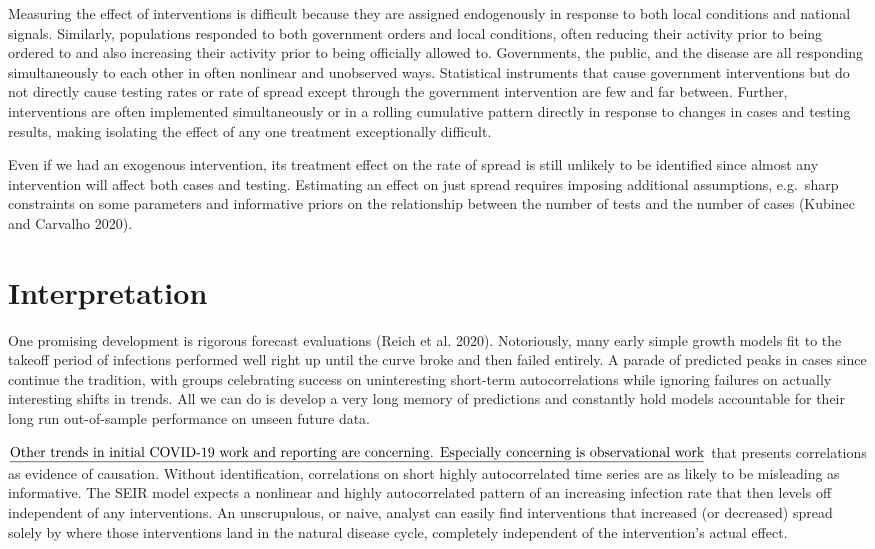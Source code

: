 \documentclass[10pt,letterpaper]{article}
\begin{document}
Measuring the effect of interventions is difficult because they are
assigned endogenously in response to both local conditions and national
signals. Similarly, populations responded to both government orders and
local conditions, often reducing their activity prior to being ordered
to and also increasing their activity prior to being officially allowed
to. Governments, the public, and the disease are all responding
simultaneously to each other in often nonlinear and unobserved ways.
Statistical instruments that cause government interventions but do not
directly cause testing rates or rate of spread except through the
government intervention are few and far between. Further, interventions
are often implemented simultaneously or in a rolling cumulative pattern
directly in response to changes in cases and testing results, making
isolating the effect of any one treatment exceptionally difficult.

Even if we had an exogenous intervention, its treatment effect on the
rate of spread is still unlikely to be identified since almost any
intervention will affect both cases and testing. Estimating an effect on
just spread requires imposing additional assumptions, e.g.~sharp
constraints on some parameters and informative priors on the
relationship between the number of tests and the number of cases
(Kubinec and Carvalho 2020).

\hypertarget{interpretation}{%
\section{Interpretation}\label{interpretation}}

One promising development is rigorous forecast evaluations (Reich et al.
2020). Notoriously, many early simple growth models fit to the takeoff
period of infections performed well right up until the curve broke and
then failed entirely. A parade of predicted peaks in cases since
continue the tradition, with groups celebrating success on uninteresting
short-term autocorrelations while ignoring failures on actually
interesting shifts in trends. All we can do is develop a very long
memory of predictions and constantly hold models accountable for their
long run out-of-sample performance on unseen future data.

\(\text{\underline{Other trends in initial COVID-19 work and reporting are concerning. Especially concerning is observational work}}\)
that presents correlations as evidence of causation. Without
identification, correlations on short highly autocorrelated time series
are as likely to be misleading as informative. The SEIR model expects a
nonlinear and highly autocorrelated pattern of an increasing infection
rate that then levels off independent of any interventions. An
unscrupulous, or naive, analyst can easily find interventions that
increased (or decreased) spread solely by where those interventions land
in the natural disease cycle, completely independent of the
intervention's actual effect.
\end{document}
